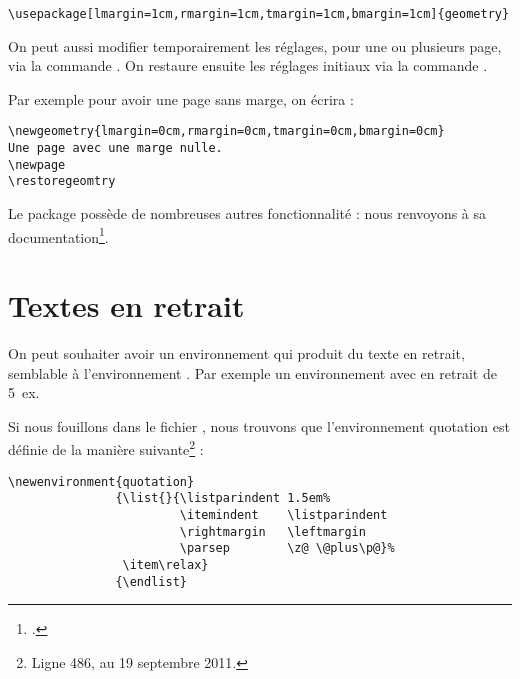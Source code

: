 \begin{verbatim}
\usepackage[lmargin=1cm,rmargin=1cm,tmargin=1cm,bmargin=1cm]{geometry}
\end{verbatim}

On peut aussi modifier temporairement les réglages, pour une ou plusieurs page, via la commande . On restaure ensuite les réglages initiaux  via la commande .

Par exemple pour avoir une page sans marge, on écrira :

\begin{verbatim}
\newgeometry{lmargin=0cm,rmargin=0cm,tmargin=0cm,bmargin=0cm}
Une page avec une marge nulle.
\newpage
\restoregeomtry

\end{verbatim}

Le package  possède de nombreuses autres fonctionnalité : nous renvoyons à sa documentation\footcite{geometry}.

\section{Textes en retrait}

On peut souhaiter avoir un environnement qui produit du texte en retrait, semblable à l'environnement . Par exemple un environnement  avec en retrait de 5~ex.

Si nous fouillons dans le fichier , nous trouvons que l'environnement quotation est définie de la manière suivante\footnote{Ligne 486, au 19 septembre 2011.} :

\begin{verbatim}
\newenvironment{quotation}
               {\list{}{\listparindent 1.5em%
                        \itemindent    \listparindent
                        \rightmargin   \leftmargin
                        \parsep        \z@ \@plus\p@}%
                \item\relax}
               {\endlist}
\end{verbatim}

